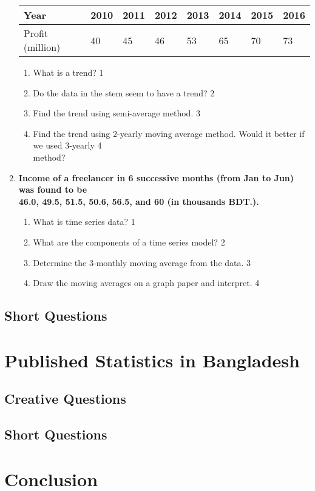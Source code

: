 \documentclass[a4paper,oneside]{book}
\begin{document}
\begin{enumerate}
	  \begin{table}[h]
	  \centering
\begin{tabular}{l|l|l|l|l|l|l|l}
Year & 2010 & 2011 & 2012 & 2013 & 2014 & 2015 & 2016 \\ \hline
Profit (million) & 40 & 45 & 46 & 53 & 65 & 70 & 73
\end{tabular}
\end{table}

  \begin{enumerate}
    \item
	What is a trend? \hfill 1
    \item
	Do the data in the stem seem to have a trend? \hfill 2
    \item  
	Find the trend using semi-average method. \hfill 3
    \item
	Find the trend using 2-yearly moving average method. Would it better if we used 3-yearly  \hfill 4 \\  method?
\end{enumerate}

 \item
	  \textbf{Income of a freelancer in 6 successive months (from Jan to Jun) was found to be \\ 46.0, 49.5, 51.5, 50.6, 56.5, and 60 (in thousands BDT.).}
  \begin{enumerate}
    \item
	What is time series data? \hfill 1
    \item
	What are the components of a time series model? \hfill 2
    \item  
	Determine the 3-monthly moving average from the data. \hfill 3
    \item
	Draw the moving averages on a graph paper and interpret. \hfill 4
\end{enumerate}

\end{enumerate}

\section{Short Questions}

\chapter{Published Statistics in Bangladesh} 
\section{Creative Questions}
\section{Short Questions}

\backmatter
\chapter{Conclusion}
\lipsum[8]

\tableofcontents
\end{document}
